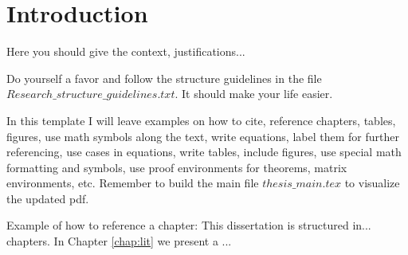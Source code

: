 \chapter{Introduction} \label{chap:intro}

Here you should give the context, justifications...

Do yourself a favor and follow the structure guidelines in the file $Research\_structure\_guidelines.txt$. It should make your life easier.

In this template I will leave examples on how to cite, reference chapters, tables, figures, use math symbols along the text, write equations, label them for further referencing, use cases in equations, write tables, include figures, use special math formatting and symbols, use proof environments for theorems, matrix environments, etc. Remember to build the main file $thesis\_main.tex$ to visualize the updated pdf.

Example of how to reference a chapter: This dissertation is structured in... chapters. In Chapter \ref{chap:lit} we present a ...

\cite{ait2001a}
